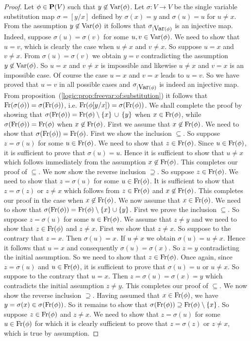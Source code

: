 \begin{proof}
Let $\phi\in\mbox{${\bf P}(V)$}$ such that $y\not\in\mbox{\rm Var}(\phi)$. Let $\sigma:V\to V$
be the single variable substitution map $\sigma=[y/x]$ defined by
$\sigma(x)=y$ and $\sigma(u)=u$ for $u\neq x$. From the assumption
$y\not\in\mbox{\rm Var}(\phi)$ it follows that $\sigma_{|\mbox{\rm Var}(\phi)}$ is an
injective map. Indeed, suppose $\sigma(u)=\sigma(v)$ for some
$u,v\in\mbox{\rm Var}(\phi)$. We need to show that $u=v$, which is clearly the
case when $u\neq x$ and $v\neq x$. So suppose $u=x$ and $v\neq x$.
From $\sigma(u)=\sigma(v)$ we obtain $y=v$ contradicting the
assumption $y\not\in\mbox{\rm Var}(\phi)$. So $u=x$ and $v\neq x$ is
impossible and likewise $u\neq x$ and $v=x$ is an impossible case.
Of course the case $u=x$ and $v=x$ leads to $u=v$. So we have proved
that $u=v$ in all possible cases and $\sigma_{|\mbox{\rm Var}(\phi)}$ is
indeed an injective map. From
proposition~(\ref{logic:prop:freevar:of:substitution}) it follows
that $\mbox{\rm Fr}(\sigma(\phi))=\sigma(\mbox{\rm Fr}(\phi))$, i.e.
$\mbox{\rm Fr}(\phi[y/x])=\sigma(\mbox{\rm Fr}(\phi))$. We shall complete the proof
by showing that
$\sigma(\mbox{\rm Fr}(\phi))=\mbox{\rm Fr}(\phi)\setminus\{x\}\,\cup\,\{y\}$ when
$x\in\mbox{\rm Fr}(\phi)$, while $\sigma(\mbox{\rm Fr}(\phi))=\mbox{\rm Fr}(\phi)$ when
$x\not\in\mbox{\rm Fr}(\phi)$.  First we assume that $x\not\in\mbox{\rm Fr}(\phi)$.
We need to show that $\sigma(\mbox{\rm Fr}(\phi))=\mbox{\rm Fr}(\phi)$. First we
show the inclusion $\subseteq$. So suppose $z=\sigma(u)$ for some
$u\in\mbox{\rm Fr}(\phi)$. We need to show that $z\in\mbox{\rm Fr}(\phi)$. Since
$u\in\mbox{\rm Fr}(\phi)$, it is sufficient to prove that $\sigma(u)=u$.
Hence it is sufficient to show that $u\neq x$ which follows
immediately from the assumption $x\not\in\mbox{\rm Fr}(\phi)$. This
completes our proof of $\subseteq$. We now show the reverse
inclusion $\supseteq$. So suppose $z\in\mbox{\rm Fr}(\phi)$. We need to show
that $z=\sigma(u)$ for some $u\in\mbox{\rm Fr}(\phi)$. It is sufficient to
show that $z=\sigma(z)$ or $z\neq x$ which follows from
$z\in\mbox{\rm Fr}(\phi)$ and $x\not\in\mbox{\rm Fr}(\phi)$. This completes our
proof in the case when $x\not\in\mbox{\rm Fr}(\phi)$. We now assume that
$x\in\mbox{\rm Fr}(\phi)$. We need to show that
$\sigma(\mbox{\rm Fr}(\phi))=\mbox{\rm Fr}(\phi)\setminus\{x\}\cup\{y\}$. First we
prove the inclusion $\subseteq$. So suppose $z=\sigma(u)$ for some
$u\in\mbox{\rm Fr}(\phi)$. We assume that $z\neq y$ and we need to show that
$z\in\mbox{\rm Fr}(\phi)$ and $z\neq x$. First we show that $z\neq x$. So
suppose to the contrary that $z=x$. Then $\sigma(u)=x$. If $u\neq x$
we obtain $\sigma(u)=u\neq x$. Hence it follows that $u=x$ and
consequently $\sigma(u)=\sigma(x)$. So $z=y$ contradicting the
initial assumption. So we need to show that $z\in\mbox{\rm Fr}(\phi)$. Once
again, since $z=\sigma(u)$ and $u\in\mbox{\rm Fr}(\phi)$, it is sufficient
to prove that $\sigma(u)=u$ or $u\neq x$. So suppose to the contrary
that $u=x$. Then $z=\sigma(u)=\sigma(x)=y$ which contradicts the
initial assumption $z\neq y$. This completes our proof of
$\subseteq$. We now show the reverse inclusion $\supseteq$. Having
assumed that $x\in\mbox{\rm Fr}(\phi)$, we have
$y=\sigma(x)\in\sigma(\mbox{\rm Fr}(\phi))$. So it remains to show that
$\sigma(\mbox{\rm Fr}(\phi))\supseteq\mbox{\rm Fr}(\phi)\setminus\{x\}$. So suppose
$z\in\mbox{\rm Fr}(\phi)$ and $z\neq x$. We need to show that $z=\sigma(u)$
for some $u\in\mbox{\rm Fr}(\phi)$ for which it is clearly sufficient to
prove that $z=\sigma(z)$ or $z\neq x$, which is true by assumption.
\end{proof}

